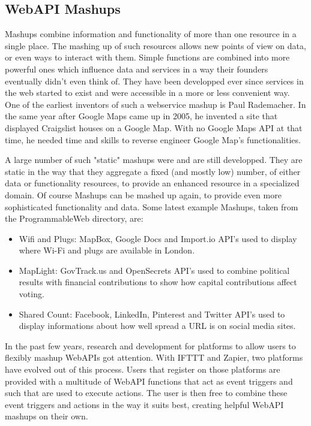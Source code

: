 \subsection{WebAPI Mashups}
Mashups combine information and functionality of more than one resource in a single place.
The mashing up of such resources allows new points of view on data, or even ways to interact with them.
Simple functions are combined into more powerful ones which influence data and services in a way their founders eventually didn't even think of.
They have been developped ever since services in the web started to exist and were accessible in a more or less convenient way.
One of the earliest inventors of such a webservice mashup is Paul Rademacher.
In the same year after Google Maps came up in 2005, he invented a site\cite{wwwRademacherOne,wwwRademacherTwo} that displayed Craigslist houses on a Google Map.
With no Google Maps API at that time, he needed time and skills to reverse engineer Google Map's functionalities.


A large number of such "static" mashups were and are still developped.
They are static in the way that they aggregate a fixed (and mostly low) number, of either data or functionality resources, to provide an enhanced resource in a specialized domain.
Of course Mashups can be mashed up again, to provide even more sophisticated functionality and data.
Some latest example Mashups, taken from the ProgrammableWeb\cite{wwwProgrammableWeb} directory, are:

\begin{itemize}
  \item Wifi and Plugs\cite{wwwWifiAndPlugs}: MapBox, Google Docs and Import.io API's used to display where Wi-Fi and plugs are available in London.
  \item MapLight\cite{wwwMapLight}: GovTrack.us and OpenSecrets API's used to combine political results with financial contributions to show how capital contributions affect voting.
  \item Shared Count\cite{wwwSharedCount}: Facebook, LinkedIn, Pinterest and Twitter API's used to display informations about how well spread a URL is on social media sites.
\end{itemize}

In the past few years, research and development for platforms to allow users to flexibly mashup WebAPIs got attention.
With IFTTT and Zapier, two platforms have evolved out of this process.
Users that register on those platforms are provided with a multitude of WebAPI functions that act as event triggers and such that are used to execute actions.
The user is then free to combine these event triggers and actions in the way it suits best, creating helpful WebAPI mashups on their own.

